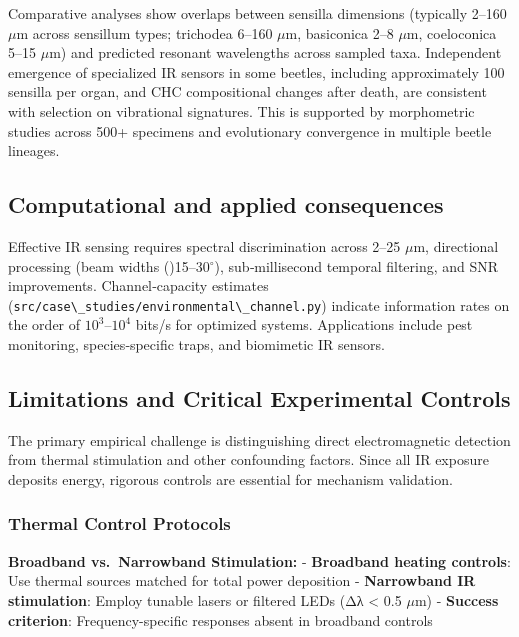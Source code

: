\documentclass[
  13pt,
  a4paperpaper,
  12pt]{article}
\newcommand{\passthrough}[1]{#1}
\begin{document}
Comparative analyses show overlaps between sensilla dimensions
(typically 2--160 \(\mu\mathrm{m}\) across sensillum types; trichodea
6--160 \(\mu\mathrm{m}\), basiconica 2--8 \(\mu\mathrm{m}\), coeloconica
5--15 \(\mu\mathrm{m}\)) and predicted resonant wavelengths across
sampled taxa. Independent emergence of specialized IR sensors in some
beetles, including approximately 100 sensilla per organ, and CHC
compositional changes after death, are consistent with selection on
vibrational signatures. This is supported by morphometric studies across
500+ specimens and evolutionary convergence in multiple beetle lineages.

\subsection{Computational and applied
consequences}\label{computational-and-applied-consequences}

Effective IR sensing requires spectral discrimination across 2--25
\(\mu\mathrm{m}\), directional processing (beam widths
(\approx)15--30\(^{\circ}\)), sub‑millisecond temporal filtering, and
SNR improvements. Channel‑capacity estimates
(\passthrough{\lstinline!src/case\_studies/environmental\_channel.py!})
indicate information rates on the order of \(10^3\)--\(10^4\) bits/s for
optimized systems. Applications include pest monitoring,
species‑specific traps, and biomimetic IR sensors.

\subsection{Limitations and Critical Experimental
Controls}\label{limitations-and-critical-experimental-controls}

The primary empirical challenge is distinguishing direct electromagnetic
detection from thermal stimulation and other confounding factors. Since
all IR exposure deposits energy, rigorous controls are essential for
mechanism validation.

\subsubsection{Thermal Control
Protocols}\label{thermal-control-protocols}

\textbf{Broadband vs.~Narrowband Stimulation:} - \textbf{Broadband
heating controls}: Use thermal sources matched for total power
deposition - \textbf{Narrowband IR stimulation}: Employ tunable lasers
or filtered LEDs (Δλ \textless{} 0.5 \(\mu\mathrm{m}\)) -
\textbf{Success criterion}: Frequency-specific responses absent in
broadband controls
\end{document}
